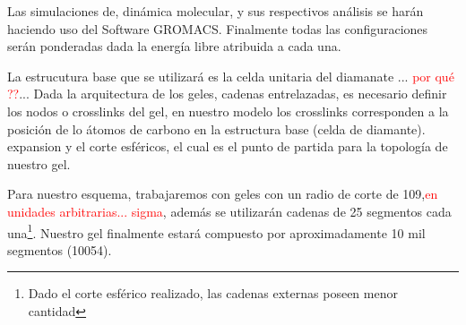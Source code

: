 Las simulaciones de, din\'amica molecular, y sus respectivos an\'alisis se harán haciendo uso del Software GROMACS. \addcite[11] 
Finalmente todas las configuraciones serán  ponderadas dada la energía libre atribuida a cada una. \addcite[12]

La estrucutura base que se utilizar\'a es la celda unitaria del diamanate ...\textcolor{red}{ por qu\'e ??}...
Dada la arquitectura de los geles, cadenas entrelazadas, es necesario definir los nodos o crosslinks del gel,  en nuestro modelo los crosslinks corresponden a la posici\'on de lo \'atomos de carbono en la estructura base (celda de diamante).
expansion y el corte esféricos, el cual es el punto de partida para la topolog\'ia de nuestro gel.

Para nuestro esquema, trabajaremos con geles con un radio de corte de 109,\textcolor{red}{en unidades arbitrarias... sigma}, además se utilizarán cadenas de 25 segmentos cada una\footnote{Dado el corte esférico realizado, las cadenas externas poseen menor cantidad}. Nuestro gel finalmente estará compuesto por aproximadamente 10 mil segmentos (10054).
